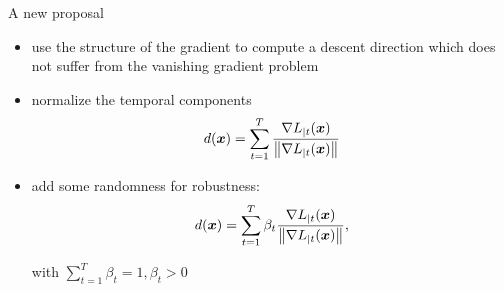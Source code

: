 \begin{frame}{A new proposal}
\begin{itemize}
	\item use the structure of the gradient to compute a descent direction which does not suffer from the vanishing gradient problem
	
	\item normalize the temporal components
	\begin{equation}
	d(\boldsymbol{x}) = \sum_{t=1}^T \frac{\nabla L_{|t}(\boldsymbol{x})}{\left\Vert \nabla L_{|t}(\boldsymbol{x}) \right\Vert}
	\end{equation}
	
	\item add some randomness for robustness:
		\begin{equation}
		d(\boldsymbol{x}) = \sum_{t=1}^T \beta_t\frac{\nabla L_{|t}(\boldsymbol{x})}{\left\Vert \nabla L_{|t}(\boldsymbol{x}) \right\Vert},
		\end{equation}
		
		with $\sum_{t=1}^T\beta_t=1, \beta_t>0$
\end{itemize}



\end{frame}
